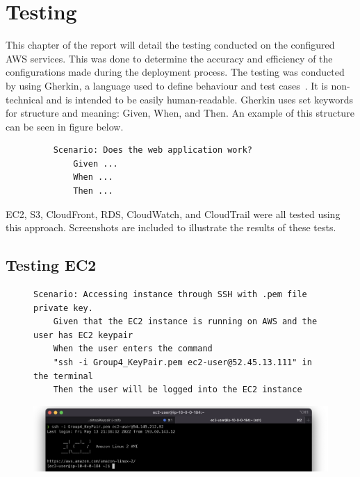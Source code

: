 \chapter{Testing}\label{ch:testing}

This chapter of the report will detail the testing conducted on the configured AWS services.
This was done to determine the accuracy and efficiency of the configurations made during the deployment process.
The testing was conducted by using Gherkin, a language used to define behaviour and test
cases~\parencite{dos2018automated}.
It is non-technical and is intended to be easily human-readable.
Gherkin uses set keywords for structure and meaning: Given, When, and Then.
An example of this structure can be seen in figure below.

\begin{figure}[!htbp]
    \centering
    \begin{verbatim}
    Scenario: Does the web application work?
        Given ...
        When ...
        Then ...
    \end{verbatim}
    \label{fig:gherkin}
\end{figure}

EC2, S3, CloudFront, RDS, CloudWatch, and CloudTrail were all tested using this approach.
Screenshots are included to illustrate the results of these tests.

\section{Testing EC2}\label{sec:testing-ec2}

\begin{figure}[!htbp]
    \centering
    \begin{verbatim}
Scenario: Accessing instance through SSH with .pem file private key.
    Given that the EC2 instance is running on AWS and the user has EC2 keypair
    When the user enters the command
    "ssh -i Group4_KeyPair.pem ec2-user@52.45.13.111" in the terminal
    Then the user will be logged into the EC2 instance
    \end{verbatim}
    \label{fig:accessing-instance-ec2}
\end{figure}

\begin{figure}[!htbp]
    \centering
    \includegraphics[width=\textwidth]{resources/ec2/ec2-logged-in}
    \label{fig:ec2-test-logged-in}
\end{figure}

